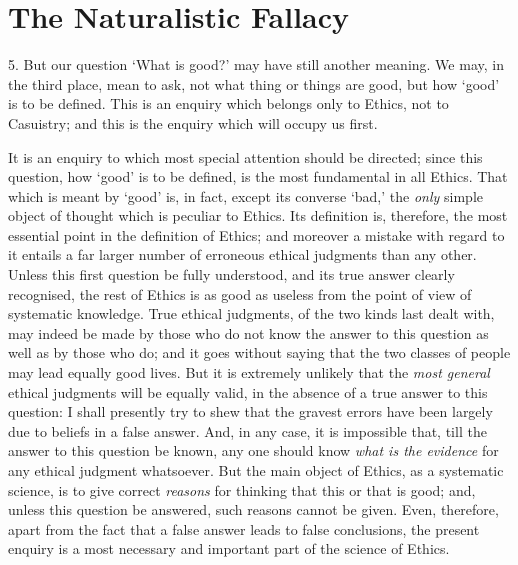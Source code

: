 
\author{G. E. Moore}
\chapter{The Naturalistic Fallacy}

5. But our question `What is good?' may have still another
meaning. We may, in the third place, mean to ask, not what thing or
things are good, but how `good' is to be defined. This is an enquiry
which belongs only to Ethics, not to Casuistry; and this is the
enquiry which will occupy us first.

It is an enquiry to which most special attention should be directed;
since this question, how `good' is to be defined, is the most
fundamental in all Ethics. That which is meant by `good' is, in fact,
except its converse `bad,' the \textit{only} simple object of thought
which is peculiar to Ethics. Its definition is, therefore, the most
essential point in the definition of Ethics; and moreover a mistake
with regard to it entails a far larger number of erroneous ethical
judgments than any other. Unless this first question be fully
understood, and its true answer clearly recognised, the rest of Ethics
is as good as useless from the point of view of systematic knowledge.
True ethical judgments, of the two kinds last dealt with, may indeed
be made by those who do not know the answer to this question as well
as by those who do; and it goes without saying that the two classes of
people may lead equally good lives. But it is extremely unlikely that
the \textit{most general} ethical judgments will be equally valid, in
the absence of a true answer to this question: I shall presently try
to shew that the gravest errors have been largely due to 
beliefs in a false answer. And, in any case, it is impossible that,
till the answer to this question be known, any one should know
\textit{what is the evidence} for any ethical judgment whatsoever. But
the main object of Ethics, as a systematic science, is to give correct
\textit{reasons} for thinking that this or that is good; and, unless
this question be answered, such reasons cannot be given. Even,
therefore, apart from the fact that a false answer leads to false
conclusions, the present enquiry is a most necessary and important
part of the science of Ethics.

